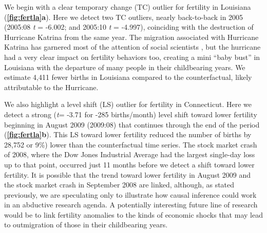 \documentclass[12pt]{article}
\begin{document}
We begin with a clear temporary change (TC) outlier for fertility in
Louisiana (\textbf{\autoref{fig:fertla}a}). Here we detect two TC
outliers, nearly back-to-back in 2005 (2005:08 \emph{t} = -6.002; and
2005:10 \emph{t} = -4.997), coinciding with the destruction of Hurricane
Katrina from the same year. The migration associated with Hurricane
Katrina has garnered most of the attention of social scientists
\citep{fussellRecoveryMigrationCity2014, horiDisplacementDynamicsSouthern2009},
but the hurricane had a very clear impact on fertility behaviors too,
creating a mini ``baby bust'' in Louisiana with the departure of many
people in their childbearing years. We estimate 4,411 fewer births in
Louisiana compared to the counterfactual, likely attributable to the
Hurricane.

We also highlight a level shift (LS) outlier for fertility in
Connecticut. Here we detect a strong (\emph{t}= -3.71 for -285
births/month) level shift toward lower fertility beginning in August
2009 (2009:08) that continues through the end of the period
(\textbf{\autoref{fig:fertla}b}). This LS toward lower fertility reduced
the number of births by 28,752 or 9\%) lower than the counterfactual
time series. The stock market crash of 2008, where the Dow Jones
Industrial Average had the largest single-day loss up to that point,
occurred just 11 months before we detect a shift toward lower fertility.
It is possible that the trend toward lower fertility in August 2009 and
the stock market crash in September 2008 are linked, although, as stated
previously, we are speculating only to illustrate how causal inference
could work in an abductive research agenda. A potentially interesting
future line of research would be to link fertility anomalies to the
kinds of economic shocks that may lead to outmigration of those in their
childbearing years.
\end{document}
